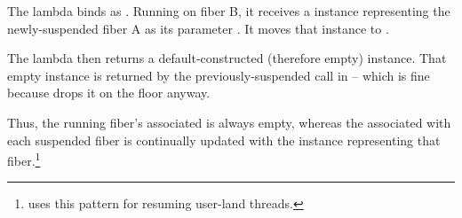 The lambda binds  as . Running on fiber B, it
receives a \fiber instance representing the newly-suspended fiber A as its
parameter . It moves that \fiber instance to .

The lambda then returns a default-constructed (therefore empty) \fiber
instance. That empty instance is returned by the previously-suspended
\resumewith call in  -- which is fine because
 drops it on the floor anyway.

Thus, the running fiber's associated  is always empty,
whereas the  associated with each suspended fiber is continually
updated with the \fiber instance representing that
fiber.\footnote{\bfiber\cite{bfiber} uses this pattern for resuming user-land
threads.}

